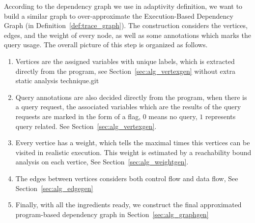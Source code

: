 According to the dependency graph we use in adaptivity definition, we want to build a similar graph to {over-}approximate the
Execution-Based Dependency Graph (in Definition~\ref{def:trace_graph}). The construction considers the vertices, edges, and the weight of every node, as well as some annotations which marks the query usage. The overall picture of this step is organized as follows.


\begin{enumerate}
\item  Vertices are the assigned variables with unique labels, which is extracted directly from the program, see Section~\ref{sec:alg_vertexgen}
without extra static analysis technique.git 
\item Query annotations are also decided directly from the program, when there is a query request, the associated variables which are the results of the query requests are marked in the form of a flag, $0$ means no query, $1$ represents query related. See Section~\ref{sec:alg_vertexgen}.
\item Every vertice has a weight, which tells the maximal times this vertices can be visited in realistic execution. This weight is estimated by a reachability bound analysis on each vertice, See Section~\ref{sec:alg_weightgen}.
\item The edges between vertices considers both control flow and data flow, See
Section~\ref{sec:alg_edgegen}
\item  Finally, with all the ingredients ready, we construct the final approximated program-based dependency graph in Section~\ref{sec:alg_graphgen}
\end{enumerate}

